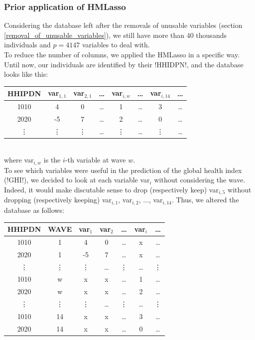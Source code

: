 \documentclass[]{article}
\begin{document}
\subsubsection{Prior application of HMLasso}
Considering the database left after the removals of unusable variables (section \ref{removal_of_unusable_variables}), we still have more than $40$ thousands individuals and $p=4147$ variables to deal with.\\
To reduce the number of columns, we applied the HMLasso in a specific way. Until now, our individuals are identified by their \pyth!HHIDPN!, and the database looks like this:
\begin{table}[!h]
\centering
\label{data_03}
\begin{tabular}{|c|c|c|c|c|c|c|c|}
	\hline
	\textbf{HHIPDN} & \textbf{var$_{1,1}$} & \textbf{var$_{2,1}$} & \dots & \textbf{var$_{i,w}$} & \dots & \textbf{var$_{i,14}$} & \dots\\
	\hline
	1010 & 4 & 0 & \dots & 1 & \dots & 3 & \dots\\
	\hline
	2020 & -5 & 7 & \dots & 2 & \dots & 0 & \dots\\
	\hline
	\vdots & \vdots & \vdots & \dots & \vdots & \dots & \vdots & \dots \\
	\hline
\end{tabular}
\end{table}\\
where var$_{i, w}$ is the $i$-th variable at wave $w$.\\
To see which variables were useful in the prediction of the global health index (\pyth!GHI!), we decided to look at each variable var$_i$ without considering the wave. Indeed, it would make discutable sense to drop (respectively keep) var$_{i, 5}$ without dropping (respectively keeping) var$_{i, 1}$, var$_{i, 2}$, $\dots$, var$_{i, 14}$. Thus, we altered the database as follows:\\
\begin{table}[!h]
	\centering
	\label{data_03_lasso}
	\begin{tabular}{|c|c|c|c|c|c|c|}
		\hline
		\textbf{HHIPDN} & \textbf{WAVE} & \textbf{var$_{1}$} & \textbf{var$_{2}$} & \dots & \textbf{var$_{i}$} & \dots\\
		\hline
		1010 & 1 & 4 & 0 & \dots & x & \dots\\
		\hline
		2020 & 1 & -5 & 7 & \dots & x & \dots\\
		\hline
		\vdots & \vdots & \vdots & \dots & \vdots & \dots & \vdots \\
		\hline
		1010 & w & x & x & \dots & 1 & \dots\\
		\hline
		2020 & w & x & x & \dots & 2 & \dots\\
		\hline
		\vdots & \vdots & \vdots & \dots & \vdots & \dots & \vdots \\
		\hline
		1010 & 14 & x & x & \dots & 3 & \dots\\
		\hline
		2020 & 14 & x & x & \dots & 0 & \dots\\
		\hline
	\end{tabular}
\end{table}\\
\end{document}
